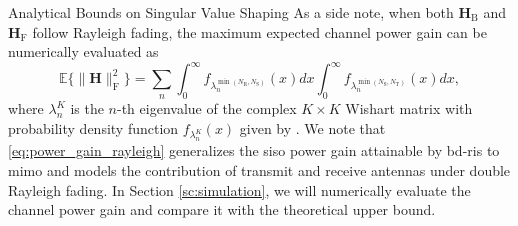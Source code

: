 \documentclass[journal]{IEEEtran}
\begin{document}
\begin{section}{Analytical Bounds on Singular Value Shaping}
		As a side note, when both $\mathbf{H}_\mathrm{B}$ and $\mathbf{H}_\mathrm{F}$ follow Rayleigh fading, the maximum expected channel power gain can be numerically evaluated as
		\begin{equation}
			\mathbb{E}\bigl\{ \lVert \mathbf{H} \rVert _ \mathrm{F}^2 \bigr\} = \sum_n \int_0^\infty f_{\lambda_n^{\min(N_\mathrm{R},N_\mathrm{S})}}(x) d x \int_0^\infty f_{\lambda_n^{\min(N_\mathrm{S},N_\mathrm{T})}}(x) d x,
			\label{eq:power_gain_rayleigh}
		\end{equation}
		where $\lambda_n^{K}$ is the $n$-th eigenvalue of the complex $K \times K$ Wishart matrix with probability density function $f_{\lambda_n^{K}}(x)$ given by \cite[Equation 51]{Zanella2009}.
		We note that \eqref{eq:power_gain_rayleigh} generalizes the \gls{siso} power gain attainable by \gls{bd}-\gls{ris} \cite[Equation 58]{Shen2020a} to \gls{mimo} and models the contribution of transmit and receive antennas under double Rayleigh fading.
		In Section \ref{sc:simulation}, we will numerically evaluate the channel power gain and compare it with the theoretical upper bound.




\end{section}
\end{document}
